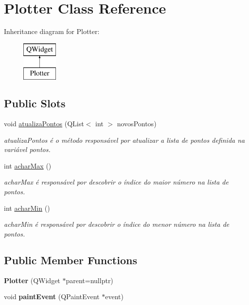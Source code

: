 \hypertarget{class_plotter}{}\section{Plotter Class Reference}
\label{class_plotter}
Inheritance diagram for Plotter\+:\begin{figure}[H]
\begin{center}
\leavevmode
\includegraphics[height=2.000000cm]{class_plotter}
\end{center}
\end{figure}
\subsection*{Public Slots}
\begin{DoxyCompactItemize}
\item 
\mbox{\label{class_plotter_af351da4e6446f6b657c9fa0a4ebb83d5}} 
void \mbox{\hyperlink{class_plotter_af351da4e6446f6b657c9fa0a4ebb83d5}{atualiza\+Pontos}} (Q\+List$<$ int $>$ novos\+Pontos)
\begin{DoxyCompactList}\small\item\em atualiza\+Pontos é o método responsável por atualizar a lista de pontos definida na variável pontos. \end{DoxyCompactList}\item 
int \mbox{\hyperlink{class_plotter_afb07f973b72d7ff1d8a03694e149d244}{achar\+Max}} ()
\begin{DoxyCompactList}\small\item\em achar\+Max é responsável por descobrir o índice do maior número na lista de pontos. \end{DoxyCompactList}\item 
int \mbox{\hyperlink{class_plotter_a9d560ccf5a5192345108a92ab2557369}{achar\+Min}} ()
\begin{DoxyCompactList}\small\item\em achar\+Min é responsável por descobrir o índice do menor número na lista de pontos. \end{DoxyCompactList}\end{DoxyCompactItemize}
\subsection*{Public Member Functions}
\begin{DoxyCompactItemize}
\item 
\mbox{\label{class_plotter_a1807627530de30ae58dff3c42a823497}} 
{\bfseries Plotter} (Q\+Widget $\ast$parent=nullptr)
\item 
\mbox{\label{class_plotter_a06477bf987646f000a8982db1352a11d}} 
void {\bfseries paint\+Event} (Q\+Paint\+Event $\ast$event)
\end{DoxyCompactItemize}


